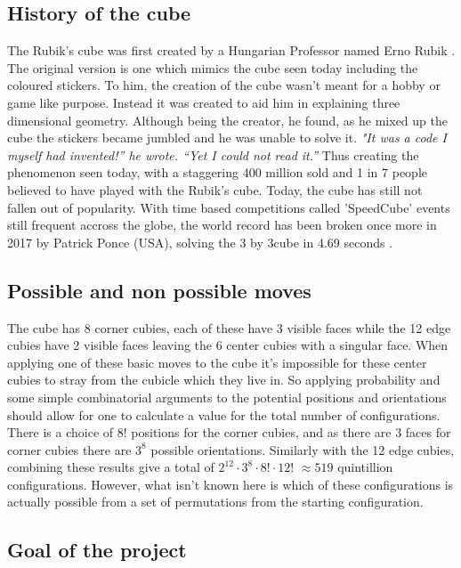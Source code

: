 \documentclass{article}
\begin{document}
\subsection{History of the cube}

The Rubik's cube was first created by a Hungarian Professor named Erno Rubik \cite{History}. The original version is one which mimics the cube seen today including the coloured stickers. To him, the creation of the cube wasn't meant for a hobby or game like purpose. Instead it was created to aid him in explaining three dimensional geometry. Although being the creator, he found, as he mixed up the cube the stickers became jumbled and he was unable to solve it.
\textit{"It was a code I myself had invented!” he wrote. “Yet I could not read it.”}
Thus creating the phenomenon seen today, with a staggering 400 million sold and 1 in 7 people believed to have played with the Rubik's cube. Today, the cube has still not fallen out of popularity. With time based competitions called 'SpeedCube' events still frequent accross the globe, the world record has been broken once more in 2017 by Patrick Ponce (USA), solving the 3 by 3cube in 4.69 seconds \cite{Record}.
\subsection{Possible and non possible moves}

The cube has 8 corner cubies, each of these have 3 visible faces while the 12 edge cubies have 2 visible faces leaving the 6 center cubies with a singular face. When applying one of these basic moves to the cube it's impossible for these center cubies to stray from the cubicle which they live in.
So applying probability and some simple combinatorial arguments to the potential positions and orientations should allow for one to calculate a value for the total number of configurations.
There is a choice of 8! positions for the corner cubies, and as there are 3 faces for corner cubies there are $3^8$ possible orientations. Similarly with the 12 edge cubies, combining these results give a total of $2^{12} \cdot 3^8 \cdot 8! \cdot 12!$ $\approx 519$ quintillion configurations.
However, what isn't known here is which of these configurations is actually possible from a set of permutations from the starting configuration.

\subsection{Goal of the project}
\end{document}
